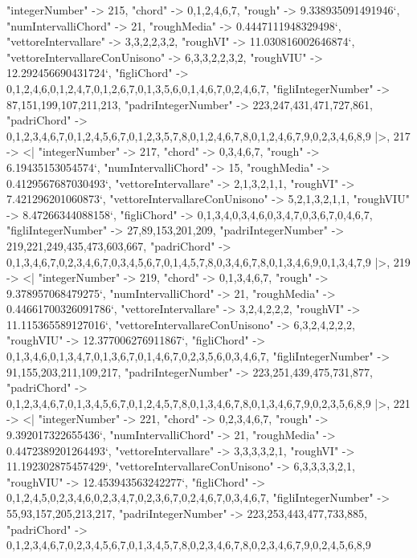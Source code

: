 \documentclass[
]{article}
\begin{document}
\begin{DatasetVerbatim}
    "integerNumber" -> 215,
    "chord" -> {0,1,2,4,6,7},
    "rough" -> 9.338935091491946`,
    "numIntervalliChord" -> 21,
    "roughMedia" -> 0.4447111948329498`,
    "vettoreIntervallare" -> {3,3,2,2,3,2},
    "roughVI" -> 11.030816002646874`,
    "vettoreIntervallareConUnisono" -> {6,3,3,2,2,3,2},
    "roughVIU" -> 12.292456690431724`,
    "figliChord" -> {{0,1,2,4,6},{0,1,2,4,7},{0,1,2,6,7},{0,1,3,5,6},{0,1,4,6,7},{0,2,4,6,7}},
    "figliIntegerNumber" -> {87,151,199,107,211,213},
    "padriIntegerNumber" -> {223,247,431,471,727,861},
    "padriChord" -> {{0,1,2,3,4,6,7},{0,1,2,4,5,6,7},{0,1,2,3,5,7,8},{0,1,2,4,6,7,8},{0,1,2,4,6,7,9},{0,2,3,4,6,8,9}}
  |>,
  217 -> <|
    "integerNumber" -> 217,
    "chord" -> {0,3,4,6,7},
    "rough" -> 6.19435153054574`,
    "numIntervalliChord" -> 15,
    "roughMedia" -> 0.4129567687030493`,
    "vettoreIntervallare" -> {2,1,3,2,1,1},
    "roughVI" -> 7.421296201060873`,
    "vettoreIntervallareConUnisono" -> {5,2,1,3,2,1,1},
    "roughVIU" -> 8.47266344088158`,
    "figliChord" -> {{0,1,3,4},{0,3,4,6},{0,3,4,7},{0,3,6,7},{0,4,6,7}},
    "figliIntegerNumber" -> {27,89,153,201,209},
    "padriIntegerNumber" -> {219,221,249,435,473,603,667},
    "padriChord" -> {{0,1,3,4,6,7},{0,2,3,4,6,7},{0,3,4,5,6,7},{0,1,4,5,7,8},{0,3,4,6,7,8},{0,1,3,4,6,9},{0,1,3,4,7,9}}
  |>,
  219 -> <|
    "integerNumber" -> 219,
    "chord" -> {0,1,3,4,6,7},
    "rough" -> 9.378957068479275`,
    "numIntervalliChord" -> 21,
    "roughMedia" -> 0.44661700326091786`,
    "vettoreIntervallare" -> {3,2,4,2,2,2},
    "roughVI" -> 11.115365589127016`,
    "vettoreIntervallareConUnisono" -> {6,3,2,4,2,2,2},
    "roughVIU" -> 12.377006276911867`,
    "figliChord" -> {{0,1,3,4,6},{0,1,3,4,7},{0,1,3,6,7},{0,1,4,6,7},{0,2,3,5,6},{0,3,4,6,7}},
    "figliIntegerNumber" -> {91,155,203,211,109,217},
    "padriIntegerNumber" -> {223,251,439,475,731,877},
    "padriChord" -> {{0,1,2,3,4,6,7},{0,1,3,4,5,6,7},{0,1,2,4,5,7,8},{0,1,3,4,6,7,8},{0,1,3,4,6,7,9},{0,2,3,5,6,8,9}}
  |>,
  221 -> <|
    "integerNumber" -> 221,
    "chord" -> {0,2,3,4,6,7},
    "rough" -> 9.392017322655436`,
    "numIntervalliChord" -> 21,
    "roughMedia" -> 0.4472389201264493`,
    "vettoreIntervallare" -> {3,3,3,3,2,1},
    "roughVI" -> 11.192302875457429`,
    "vettoreIntervallareConUnisono" -> {6,3,3,3,3,2,1},
    "roughVIU" -> 12.453943563242277`,
    "figliChord" -> {{0,1,2,4,5},{0,2,3,4,6},{0,2,3,4,7},{0,2,3,6,7},{0,2,4,6,7},{0,3,4,6,7}},
    "figliIntegerNumber" -> {55,93,157,205,213,217},
    "padriIntegerNumber" -> {223,253,443,477,733,885},
    "padriChord" -> {{0,1,2,3,4,6,7},{0,2,3,4,5,6,7},{0,1,3,4,5,7,8},{0,2,3,4,6,7,8},{0,2,3,4,6,7,9},{0,2,4,5,6,8,9}}

\end{DatasetVerbatim}
\end{document}
